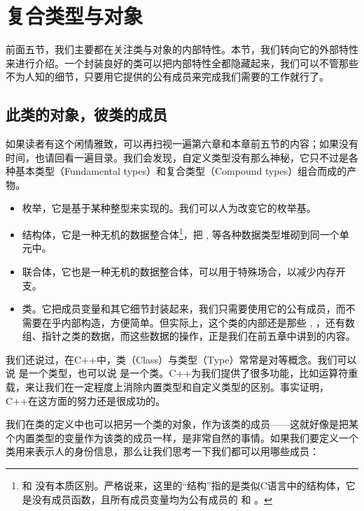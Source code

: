 \section{复合类型与对象}
前面五节，我们主要都在关注类与对象的内部特性。本节，我们转向它的外部特性来进行介绍。一个封装良好的类可以把内部特性全都隐藏起来，我们可以不管那些不为人知的细节，只要用它提供的公有成员来完成我们需要的工作就行了。\par
\subsection*{此类的对象，彼类的成员}
如果读者有这个闲情雅致，可以再扫视一遍第六章和本章前五节的内容；如果没有时间，也请回看一遍目录。我们会发现，自定义类型没有那么神秘，它只不过是各种基本类型（Fundamental types）和复合类型（Compound types）组合而成的产物。
\begin{itemize}
    \item 枚举，它是基于某种整型来实现的。我们可以人为改变它的枚举基。
    \item 结构体，它是一种无机的数据整合体\footnote{\lstinline@struct@ 和 \lstinline@class@ 没有本质区别。严格说来，这里的``结构''指的是类似C语言中的结构体，它是没有成员函数，且所有成员变量均为公有成员的 \lstinline@struct@ 和 \lstinline@class@。}，把 \lstinline@int@, \lstinline@double@ 等各种数据类型堆砌到同一个单元中。
    \item 联合体，它也是一种无机的数据整合体，可以用于特殊场合，以减少内存开支。
    \item 类。它把成员变量和其它细节封装起来，我们只需要使用它的公有成员，而不需要在乎内部构造，方便简单。但实际上，这个类的内部还是那些 \lstinline@int@, \lstinline@double@，还有数组、指针之类的数据，而这些数据的操作，正是我们在前五章中讲到的内容。
\end{itemize}
我们还说过，在C++中，类（Class）与类型（Type）常常是对等概念。我们可以说 \lstinline@valarri@ 是一个类型，也可以说 \lstinline@int@ 是一个类。C++为我们提供了很多功能，比如运算符重载，来让我们在一定程度上消除内置类型和自定义类型的区别。事实证明，C++在这方面的努力还是很成功的。\par
我们在类的定义中也可以把另一个类的对象，作为该类的成员——这就好像是把某个内置类型的变量作为该类的成员一样，是非常自然的事情。如果我们要定义一个类用来表示人的身份信息，那么让我们思考一下我们都可以用哪些成员：
